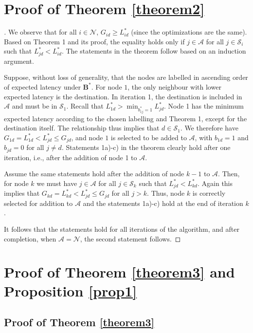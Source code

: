 \documentclass[journal,onecolumn,11pt]{IEEEtran}
\theoremstyle{plain}
\theoremstyle{definition}
\begin{document}
\section{Proof of Theorem \ref{theorem2}}\label{pt2}
\begin{proof}[\unskip\nopunct]
  We observe that for all $i \in \mathcal{N}$, $G_{id} \geq L_{id}^*$ (since the optimizations are
  the same). Based on Theorem 1 and its
  proof, the equality holds only if $j\in \mathcal{A}$ for all $j\in
  \mathcal{S}_{i}$ such that $L_{jd}^* < L_{id}^*$. The statements in
  the theorem follow based on an induction argument. 

  Suppose, without loss of generality, that the nodes are labelled in
  ascending order of expected latency under $\mathbf{B}^*$. For node $1$, the
  only neighbour with lower expected latency is the destination. In
  iteration 1, the destination is included in $\mathcal{A}$ and must
  be in $\mathcal{S}_1$. Recall that $L_{1d}^*>\min_{b^*_{1j}=1}
  L_{jd}^*$. Node 1 has the minimum expected latency according to the
  chosen labelling and Theorem 1, except for the destination
  itself. The relationship thus implies that $d\in \mathcal{S}_1$. We
  therefore have $G_{1d} = L_{1d}^* < L_{jd}^* \leq G_{jd}$, and node
  $1$ is selected to be added to $\mathcal{A}$, with $b_{1d} = 1$ and
  $b_{jd} = 0$ for all $j\neq d$. Statements 1a)-c) in the theorem
  clearly hold after one iteration, i.e., after the addition of node 1 to
  $\mathcal{A}$.

  Assume the same statements hold after the addition of node $k-1$ to
  $\mathcal{A}$. Then, for node $k$ we must have $j\in \mathcal{A}$
  for all $j\in \mathcal{S}_{k}$ such that $L_{jd}^* <
  L_{kd}^*$. Again this implies that $G_{kd}=L_{kd}^*<L_{jd}^* \leq
  G_{jd}$ for all $j>k$. Thus, node $k$ is correctly selected for
  addition to $\mathcal{A}$ and the statements 1a)-c) hold at the end
  of iteration $k$.

  It follows that the statements hold for all iterations of the
  algorithm, and after completion, when $\mathcal{A}=\mathcal{N}$, the
  second statement follows.
\end{proof}

\section{Proof of Theorem \ref{theorem3} and Proposition \ref{prop1}}\label{pt3}

\subsection{Proof of Theorem \ref{theorem3}}
\end{document}
